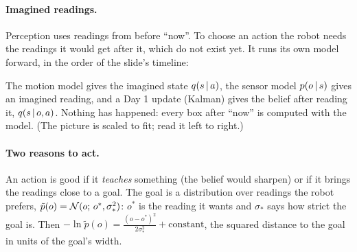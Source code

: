 \documentclass[11pt]{article}
\begin{document}
\paragraph{Imagined readings.} Perception uses readings from before ``now''. To choose an action the robot needs the readings it would get after it, which do not exist yet. It runs its own model forward, in the order of the slide's timeline:
\begin{center}
\end{center}
\vspace{-0.5em}
The motion model gives the imagined state $q(s\,|\, a)$, the sensor model $p(o\,|\, s)$ gives an imagined reading, and a Day 1 update (Kalman) gives the belief after reading it, $q(s\,|\, o,a)$. Nothing has happened: every box after ``now'' is computed with the model. (The picture is scaled to fit; read it left to right.)

\paragraph{Two reasons to act.} An action is good if it \emph{teaches} something (the belief would sharpen) or if it brings the readings close to a goal. The goal is a distribution over readings the robot prefers, $\tilde p(o) = \mathcal{N}(o;\, o^*,\sigma_*^2)$: $o^*$ is the reading it wants and $\sigma_*$ says how strict the goal is. Then $-\ln\tilde p(o) = \frac{(o-o^*)^2}{2\sigma_*^2} + \text{constant}$, the squared distance to the goal in units of the goal's width.
\end{document}
